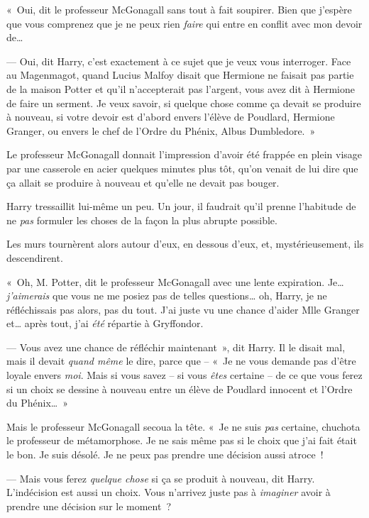 «~Oui, dit le professeur McGonagall sans tout à fait soupirer. Bien que j'espère que vous comprenez que je ne peux rien \emph{faire} qui entre en conflit avec mon devoir de…

--- Oui, dit Harry, c'est exactement à ce sujet que je veux vous interroger. Face au Magenmagot, quand Lucius Malfoy disait que Hermione ne faisait pas partie de la maison Potter et qu'il n'accepterait pas l'argent, vous avez dit à Hermione de faire un serment. Je veux savoir, si quelque chose comme ça devait se produire à nouveau, si votre devoir est d'abord envers l'élève de Poudlard, Hermione Granger, ou envers le chef de l'Ordre du Phénix, Albus Dumbledore.~»

Le professeur McGonagall donnait l'impression d'avoir été frappée en plein visage par une casserole en acier quelques minutes plus tôt, qu'on venait de lui dire que ça allait se produire à nouveau et qu'elle ne devait pas bouger.

Harry tressaillit lui-même un peu. Un jour, il faudrait qu'il prenne l'habitude de ne \emph{pas} formuler les choses de la façon la plus abrupte possible.

Les murs tournèrent alors autour d'eux, en dessous d'eux, et, mystérieusement, ils descendirent.

«~Oh, M. Potter, dit le professeur McGonagall avec une lente expiration. Je… \emph{j'aimerais} que vous ne me posiez pas de telles questions… oh, Harry, je ne réfléchissais pas alors, pas du tout. J'ai juste vu une chance d'aider Mlle Granger et… après tout, j'ai \emph{été} répartie à Gryffondor.

--- Vous avez une chance de réfléchir maintenant~», dit Harry. Il le disait mal, mais il devait \emph{quand même} le dire, parce que -- «~Je ne vous demande pas d'être loyale envers \emph{moi}. Mais si vous savez -- si vous \emph{êtes} certaine -- de ce que vous ferez si un choix se dessine à nouveau entre un élève de Poudlard innocent et l'Ordre du Phénix…~»

Mais le professeur McGonagall secoua la tête. «~Je ne suis \emph{pas} certaine, chuchota le professeur de métamorphose. Je ne sais même pas si le choix que j'ai fait était le bon. Je suis désolé. Je ne peux pas prendre une décision aussi atroce~!

--- Mais vous ferez \emph{quelque chose} si ça se produit à nouveau, dit Harry. L'indécision est aussi un choix. Vous n'arrivez juste pas à \emph{imaginer} avoir à prendre une décision sur le moment~?

